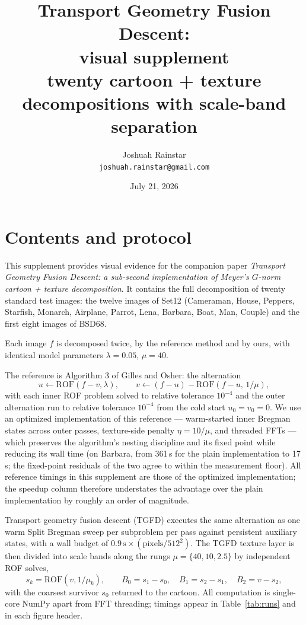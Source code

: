 \documentclass[11pt]{article}
\title{Transport Geometry Fusion Descent:\\ visual supplement\\
\large twenty cartoon + texture decompositions with scale-band separation}
\author{Joshuah Rainstar\\
\texttt{joshuah.rainstar@gmail.com}}
\date{July 21, 2026}
\newcommand{\ROF}{\mathrm{ROF}}
\begin{document}
\maketitle

\section{Contents and protocol}

This supplement provides visual evidence for the companion paper
\emph{Transport Geometry Fusion Descent: a sub-second implementation of
Meyer's $G$-norm cartoon + texture decomposition}. It contains the full
decomposition of twenty standard test images: the twelve images of Set12
(Cameraman, House, Peppers, Starfish, Monarch, Airplane, Parrot, Lena,
Barbara, Boat, Man, Couple) and the first eight images of BSD68.

Each image $f$ is decomposed twice, by the reference method and by ours,
with identical model parameters $\lambda=0.05$, $\mu=40$.

The reference is Algorithm 3 of Gilles and Osher: the alternation
\[
u \leftarrow \ROF(f-v,\lambda),
\qquad
v \leftarrow (f-u)-\ROF(f-u,\,1/\mu),
\]
with each inner ROF problem solved to relative tolerance $10^{-4}$ and the
outer alternation run to relative tolerance $10^{-4}$ from the cold start
$u_0=v_0=0$. We use an optimized implementation of this reference ---
warm-started inner Bregman states across outer passes, texture-side
penalty $\eta=10/\mu$, and threaded FFTs --- which preserves the
algorithm's nesting discipline and its fixed point while reducing its wall
time (on Barbara, from 361\,s for the plain implementation to 17\,s; the
fixed-point residuals of the two agree to within the measurement floor).
All reference timings in this supplement are those of the optimized
implementation; the speedup column therefore understates the advantage
over the plain implementation by roughly an order of magnitude.

Transport geometry fusion descent (TGFD) executes the same alternation as
one warm Split Bregman sweep per subproblem per pass against persistent
auxiliary states, with a wall budget of $0.9\,\mathrm{s}\times
(\text{pixels}/512^2)$. The TGFD texture layer is then divided into scale
bands along the rungs $\mu=\{40,10,2.5\}$ by independent ROF solves,
\[
s_k=\ROF(v,1/\mu_k),\qquad
B_0=s_1-s_0,\quad B_1=s_2-s_1,\quad B_2=v-s_2,
\]
with the coarsest survivor $s_0$ returned to the cartoon. All computation
is single-core NumPy apart from FFT threading; timings appear in
Table~\ref{tab:runs} and in each figure header.
\end{document}
